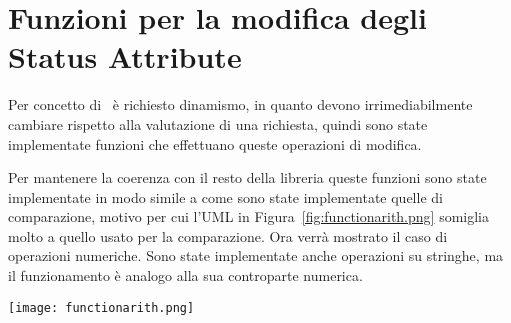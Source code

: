 \section{Funzioni per la modifica degli Status Attribute} %
\label{sec:funzioni_aritmetiche_per_la_modifica_degli_statusattribute}
Per concetto di \statusattribute \ è  richiesto dinamismo, in quanto devono irrimediabilmente cambiare rispetto alla valutazione di una richiesta, quindi sono state implementate funzioni che effettuano queste operazioni di modifica.\\ \par
Per mantenere la coerenza con il resto della libreria queste funzioni sono state implementate in modo simile a come sono state implementate quelle di comparazione, motivo per cui l'UML in Figura~\ref{fig:functionarith.png} somiglia molto a quello usato per la comparazione.
Ora verrà mostrato il caso di operazioni numeriche. Sono state implementate anche operazioni su stringhe, ma il funzionamento è analogo alla sua controparte numerica.\\ \par

\begin{sidewaysfigure}
    \centering
	\texttt{[image: functionarith.png]}
    \caption{Grafico UML per la gerarchia di funzioni aritmetiche}
    \label{fig:functionarith.png}
\end{sidewaysfigure}

